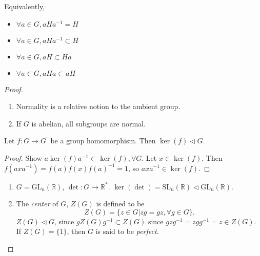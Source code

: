 Equivalently,
\begin{itemize}
  \item{$\forall a \in G, a H a^{-1} = H$}
  \item{$\forall a \in G, a H a^{-1} \subset H$}
  \item{$\forall a \in G, a H \subset Ha$}
  \item{$\forall a \in G, a H a \subset a H$}
\end{itemize}
\begin{proof}
%

\begin{remark}
\begin{enumerate}
  \item{Normality is a relative notion to the ambient group.}
  \item{If $G$ is abelian, all subgroups are normal.}
\end{enumerate}
\end{remark}

\begin{prop}
Let $f : G \to G^\prime$ be a group homomorphism. Then
$\ker(f) \triangleleft G$.
\end{prop}
\begin{proof}
Show $a \ker(f) a^{-1} \subset \ker(f), \forall G$.
Let $x \in \ker(f).$ Then
$f(a x a^{-1}) = f(a) f(x) f(a)^{-1} = 1$, so
$a x a^{-1} \in \ker(f)$.
\end{proof}

\begin{xmpl}
\begin{enumerate}
  \item{$G = \mathrm{\mathrm{GL}}_n(\mathbb{R})$, $\det : G \to \mathbb{R}^\ast$.
        $\ker(\det) = \mathrm{SL}_n(\mathbb{R})
                    \triangleleft \mathrm{\mathrm{GL}}_n(\mathbb{R})$.
       }
  \item{The \emph{center} of $G$, $Z(G)$ is defined to be
        $$
        Z(G) = \{ z \in G | z g = g z, \forall g \in G \}.
        $$
        $Z(G) \triangleleft G$, since $g Z(G) g^{-1} \subset Z(G)$
        since $g z g^{-1} = z g g^{-1} = z \in Z(G)$. If
        $Z(G) = \{1\}$, then $G$ is said to be \emph{perfect}.
        }
\end{enumerate}
\end{xmpl}


\end{proof}
